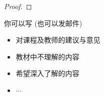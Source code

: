 \documentclass[a4paper, justified]{tufte-handout}
\begin{document}
\begin{proof}
\end{proof}

\beginfb

你可以写 (也可以发邮件)
\begin{itemize}
  \item 对课程及教师的建议与意见
  \item 教材中不理解的内容
  \item 希望深入了解的内容
  \item $\cdots$
\end{itemize}
\end{document}
